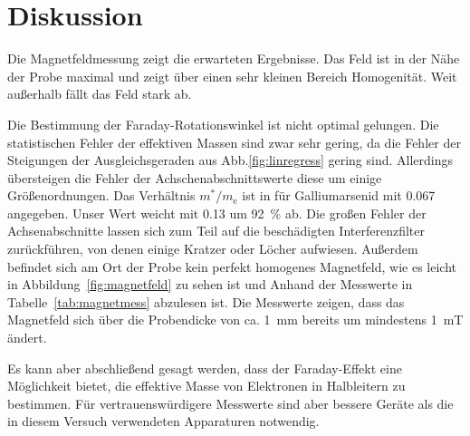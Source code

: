 
\section{Diskussion}
Die Magnetfeldmessung zeigt die erwarteten Ergebnisse. Das Feld ist in
der Nähe der Probe maximal und zeigt über einen sehr kleinen Bereich
Homogenität.  Weit außerhalb fällt das Feld stark ab.

Die Bestimmung der Faraday-Rotationswinkel ist nicht optimal gelungen.
Die statistischen Fehler der effektiven Massen sind zwar sehr gering, da
die Fehler der Steigungen der Ausgleichsgeraden aus
Abb.\ref{fig:linregress} gering sind. Allerdings übersteigen die Fehler
der Achschenabschnittswerte diese um einige Größenordnungen.  Das
Verhältnis $m^*/m_\text{e}$ ist in \cite{ecee-colorado} für
Galliumarsenid mit \num{0.067} angegeben.  Unser Wert weicht mit
\num{0.13} um \SI{92}{\percent} ab.  Die großen Fehler der
Achsenabschnitte lassen sich zum Teil auf die beschädigten
Interferenzfilter zurückführen, von denen einige Kratzer oder Löcher
aufwiesen. Außerdem befindet sich am Ort der Probe kein perfekt
homogenes Magnetfeld, wie es leicht in Abbildung~\ref{fig:magnetfeld} zu
sehen ist und Anhand der Messwerte in Tabelle~\ref{tab:magnetmess}
abzulesen ist. Die Messwerte zeigen, dass das Magnetfeld sich über die
Probendicke von ca. \SI{1}{\milli\metre} bereits um mindestens
\SI{1}{\milli\tesla} ändert.

Es kann aber abschließend gesagt werden, dass der Faraday-Effekt 
eine Möglichkeit bietet, die effektive Masse von Elektronen in 
Halbleitern zu bestimmen. Für vertrauenswürdigere Messwerte sind aber 
bessere Geräte als die in diesem Versuch verwendeten Apparaturen 
notwendig. 
